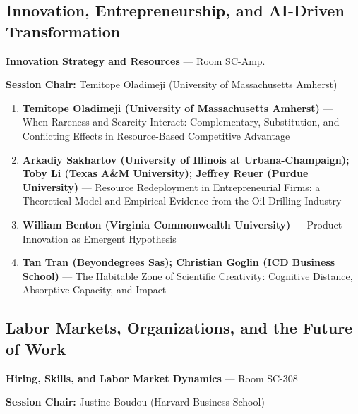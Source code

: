 \documentclass[
  10pt,
  letterpaper,
  DIV=11,
  numbers=noendperiod]{scrartcl}
\begin{document}
\subsection{\texorpdfstring{\textcolor{innovation}{Innovation, Entrepreneurship, and AI-Driven Transformation}}{}}\label{section-34}

\textbf{Innovation Strategy and Resources} --- Room SC-Amp.

\textbf{Session Chair:} Temitope Oladimeji (University of Massachusetts
Amherst)

\begin{enumerate}
\def\labelenumi{\arabic{enumi}.}
\item
  \textbf{Temitope Oladimeji (University of Massachusetts Amherst)} ---
  When Rareness and Scarcity Interact: Complementary, Substitution, and
  Conflicting Effects in Resource-Based Competitive Advantage
\item
  \textbf{Arkadiy Sakhartov (University of Illinois at
  Urbana-Champaign); Toby Li (Texas A\&M University); Jeffrey Reuer
  (Purdue University)} --- Resource Redeployment in Entrepreneurial
  Firms: a Theoretical Model and Empirical Evidence from the
  Oil-Drilling Industry
\item
  \textbf{William Benton (Virginia Commonwealth University)} --- Product
  Innovation as Emergent Hypothesis
\item
  \textbf{Tan Tran (Beyondegrees Sas); Christian Goglin (ICD Business
  School)} --- The Habitable Zone of Scientific Creativity: Cognitive
  Distance, Absorptive Capacity, and Impact
\end{enumerate}

\subsection{\texorpdfstring{\textcolor{labor}{Labor Markets, Organizations, and the Future of Work}}{}}\label{section-35}

\textbf{Hiring, Skills, and Labor Market Dynamics} --- Room SC-308

\textbf{Session Chair:} Justine Boudou (Harvard Business School)
\end{document}
